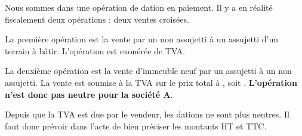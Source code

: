 		Nous sommes dans une opération de dation en paiement. Il y a en réalité fiscalement deux opérations : deux ventes croisées.

		La première opération est la vente par un non assujetti à un assujetti d'un terrain à bâtir. L'opération est exonérée de TVA.

		La deuxième opération est la vente d'immeuble neuf par un assujetti à un non assujetti. La vente est soumise à la TVA sur le prix total à , soit . \textbf{L'opération n'est donc pas neutre pour la société A}.

		Depuis que la TVA est due par le vendeur, les dations ne sont plus neutres. Il faut donc prévoir dans l'acte de bien préciser les montants HT et TTC.
